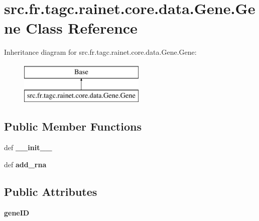 \hypertarget{classsrc_1_1fr_1_1tagc_1_1rainet_1_1core_1_1data_1_1Gene_1_1Gene}{\section{src.\-fr.\-tagc.\-rainet.\-core.\-data.\-Gene.\-Gene Class Reference}
\label{classsrc_1_1fr_1_1tagc_1_1rainet_1_1core_1_1data_1_1Gene_1_1Gene}
}
Inheritance diagram for src.\-fr.\-tagc.\-rainet.\-core.\-data.\-Gene.\-Gene\-:\begin{figure}[H]
\begin{center}
\leavevmode
\includegraphics[height=2.000000cm]{classsrc_1_1fr_1_1tagc_1_1rainet_1_1core_1_1data_1_1Gene_1_1Gene}
\end{center}
\end{figure}
\subsection*{Public Member Functions}
\begin{DoxyCompactItemize}
\item 
\hypertarget{classsrc_1_1fr_1_1tagc_1_1rainet_1_1core_1_1data_1_1Gene_1_1Gene_a2d57c0ba3f6f474d04bc3114b5382242}{def {\bfseries \-\_\-\-\_\-init\-\_\-\-\_\-}}\label{classsrc_1_1fr_1_1tagc_1_1rainet_1_1core_1_1data_1_1Gene_1_1Gene_a2d57c0ba3f6f474d04bc3114b5382242}

\item 
\hypertarget{classsrc_1_1fr_1_1tagc_1_1rainet_1_1core_1_1data_1_1Gene_1_1Gene_a6c674ac24c37a47b4e9877bbdb631422}{def {\bfseries add\-\_\-rna}}\label{classsrc_1_1fr_1_1tagc_1_1rainet_1_1core_1_1data_1_1Gene_1_1Gene_a6c674ac24c37a47b4e9877bbdb631422}

\end{DoxyCompactItemize}
\subsection*{Public Attributes}
\begin{DoxyCompactItemize}
\item 
\hypertarget{classsrc_1_1fr_1_1tagc_1_1rainet_1_1core_1_1data_1_1Gene_1_1Gene_aa41848fc9f2bb8d4d7a8acad9cc7b83e}{{\bfseries gene\-I\-D}}\label{classsrc_1_1fr_1_1tagc_1_1rainet_1_1core_1_1data_1_1Gene_1_1Gene_aa41848fc9f2bb8d4d7a8acad9cc7b83e}

\end{DoxyCompactItemize}
